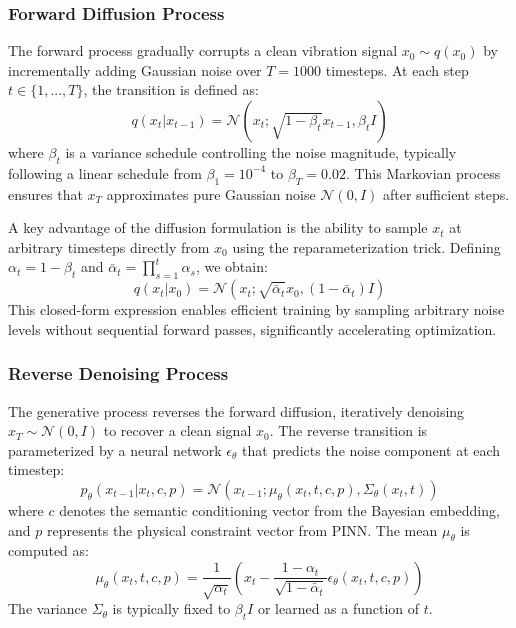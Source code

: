 \documentclass[journal]{IEEEtran}
\begin{document}
\subsubsection{Forward Diffusion Process}
The forward process gradually corrupts a clean vibration signal $x_0 \sim q(x_0)$ by incrementally adding Gaussian noise over $T=1000$ timesteps. At each step $t \in \{1, ..., T\}$, the transition is defined as:
\begin{equation}
    q(x_t | x_{t-1}) = \mathcal{N}(x_t; \sqrt{1-\beta_t}x_{t-1}, \beta_t I)
    \label{eq:forward_step}
\end{equation}
where $\beta_t$ is a variance schedule controlling the noise magnitude, typically following a linear schedule from $\beta_1=10^{-4}$ to $\beta_T=0.02$. This Markovian process ensures that $x_T$ approximates pure Gaussian noise $\mathcal{N}(0, I)$ after sufficient steps.

A key advantage of the diffusion formulation is the ability to sample $x_t$ at arbitrary timesteps directly from $x_0$ using the reparameterization trick. Defining $\alpha_t = 1 - \beta_t$ and $\bar{\alpha}_t = \prod_{s=1}^t \alpha_s$, we obtain:
\begin{equation}
    q(x_t | x_0) = \mathcal{N}(x_t; \sqrt{\bar{\alpha}_t}x_0, (1-\bar{\alpha}_t)I)
    \label{eq:forward_marginal}
\end{equation}
This closed-form expression enables efficient training by sampling arbitrary noise levels without sequential forward passes, significantly accelerating optimization.

\subsubsection{Reverse Denoising Process}
The generative process reverses the forward diffusion, iteratively denoising $x_T \sim \mathcal{N}(0, I)$ to recover a clean signal $x_0$. The reverse transition is parameterized by a neural network $\epsilon_\theta$ that predicts the noise component at each timestep:
\begin{equation}
    p_\theta(x_{t-1} | x_t, c, p) = \mathcal{N}(x_{t-1}; \mu_\theta(x_t, t, c, p), \Sigma_\theta(x_t, t))
    \label{eq:reverse_step}
\end{equation}
where $c$ denotes the semantic conditioning vector from the Bayesian embedding, and $p$ represents the physical constraint vector from PINN. The mean $\mu_\theta$ is computed as:
\begin{equation}
    \mu_\theta(x_t, t, c, p) = \frac{1}{\sqrt{\alpha_t}} \left( x_t - \frac{1-\alpha_t}{\sqrt{1-\bar{\alpha}_t}} \epsilon_\theta(x_t, t, c, p) \right)
    \label{eq:reverse_mean}
\end{equation}
The variance $\Sigma_\theta$ is typically fixed to $\beta_t I$ or learned as a function of $t$.
\end{document}
